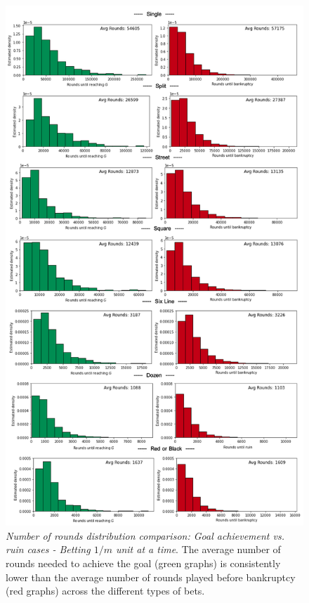 \documentclass[11pt,twoside]{article}
\numberwithin{Theorem}{section}
\numberwithin{Definition}{section}
\numberwithin{Lemma}{section}
\numberwithin{Algorithm}{section}
\numberwithin{equation}{section}
\begin{document}
\begin{figure}[H]
        \centering
        \includegraphics[width=13cm]{hists_2.png}
        \caption[Number of rounds distribution comparison: Goal achievement vs. ruin cases - Betting $1/m$ unit at a time.] {\textit{Number of rounds distribution comparison: Goal achievement vs. ruin cases - Betting $1/m$ unit at a time}. The average number of rounds needed to achieve the goal (green graphs) is consistently lower than the average number of rounds played before bankruptcy (red graphs) across the different types of bets.} \label{fig:hists_2}
\end{figure}
\end{document}
